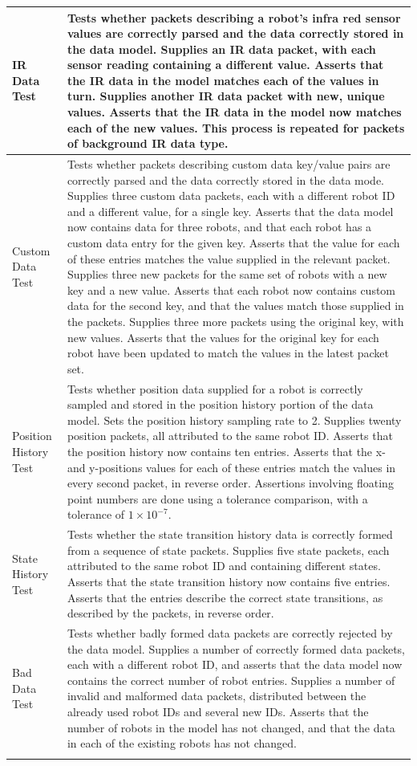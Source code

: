 \begin{longtable}{ l p{10cm} }
\hline
 IR Data Test & Tests whether packets describing a robot's infra red sensor values are correctly parsed and the data correctly stored in the data model. Supplies an IR data packet, with each sensor reading containing a different value. Asserts that the IR data in the model matches each of the values in turn. Supplies another IR data packet with new, unique values. Asserts that the IR data in the model now matches each of the new values. This process is repeated for packets of background IR data type.\\
\hline
 Custom Data Test & Tests whether packets describing custom data key/value pairs are correctly parsed and the data correctly stored in the data mode. Supplies three custom data packets, each with a different robot ID and a different value, for a single key. Asserts that the data model now contains data for three robots, and that each robot has a custom data entry for the given key. Asserts that the value for each of these entries matches the value supplied in the relevant packet. Supplies three new packets for the same set of robots with a new key and a new value. Asserts that each robot now contains custom data for the second key, and that the values match those supplied in the packets. Supplies three more packets using the original key, with new values. Asserts that the values for the original key for each robot have been updated to match the values in the latest packet set.\\
\hline
 Position History Test & Tests whether position data supplied for a robot is correctly sampled and stored in the position history portion of the data model. Sets the position history sampling rate to 2. Supplies twenty position packets, all attributed to the same robot ID. Asserts that the position history now contains ten entries. Asserts that the x- and y-positions values for each of these entries match the values in every second packet, in reverse order. Assertions involving floating point numbers are done using a tolerance comparison, with a tolerance of $ 1 \times 10^{-7} $.\\
\hline
 State History Test & Tests whether the state transition history data is correctly formed from a sequence of state packets. Supplies five state packets, each attributed to the same robot ID and containing different states. Asserts that the state transition history now contains five entries. Asserts that the entries describe the correct state transitions, as described by the packets, in reverse order.\\
\hline
 Bad Data Test & Tests whether badly formed data packets are correctly rejected by the data model. Supplies a number of correctly formed data packets, each with a different robot ID, and asserts that the data model now contains the correct number of robot entries. Supplies a number of invalid and malformed data packets, distributed between the already used robot IDs and several new IDs. Asserts that the number of robots in the model has not changed, and that the data in each of the existing robots has not changed.\\
 \bottomrule\\


\end{longtable}
